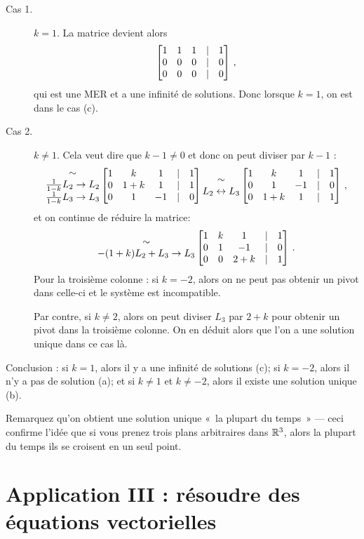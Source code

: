 \begin{myprob}
\begin{mysol}
\begin{description}
	\item[Cas 1.]  $k = 1$.  La matrice devient alors
$$
\left[ \begin{matrix} 
1&1&1&|&1\\
0 & 0 & 0 &|& 0\\
0&0&0&|&0 \end{matrix} \right]\,,
$$
qui est une MER et a une infinité de solutions.  Donc lorsque $k=1$, on est dans le cas (c).
	\item[Cas 2.] $k \neq 1$.  Cela veut dire que $k-1 \neq 0$ et donc on peut diviser par $k-1$ :
$$
\begin{matrix} \sim\\\frac{1}{1-k} L_2\to L_2 \\ \frac{1}{1-k}L_3\to L_3 \end{matrix}
\left[ \begin{matrix} 
1&k&1&|&1\\
0 & 1+k & 1 &|& 1\\
0&1&-1&|&0 \end{matrix} \right]
\begin{matrix} \sim\\L_2 \leftrightarrow L_3 \end{matrix}
\left[ \begin{matrix} 
1&k&1&|&1\\
0&1&-1&|&0\\
0 & 1+k & 1 &|& 1 \end{matrix} \right]\,,
$$
et on continue de réduire la matrice: 
$$
\begin{matrix} \sim \\ -(1+k)L_2+L_3\to L_3 \end{matrix}
\left[ \begin{matrix} 
1&k&1&|&1\\
0&1&-1&|&0\\
0 & 0 & 2+k &|& 1 \end{matrix} \right]\,.
$$
Pour la troisième colonne : si $k = -2$, alors on ne peut pas obtenir un pivot dans celle-ci et le système est incompatible.  

Par contre, si $k\neq 2$, alors on peut diviser $L_3$ par $2+k$ pour obtenir un pivot dans la troisième colonne.
On en déduit alors que l'on a une solution unique dans ce cas là.
\end{description}
Conclusion : si $k=1$, alors il y a une infinité de solutions (c);  si $k=-2$, alors il n'y a pas de solution (a);
et si $k \neq 1$ et $k \neq -2$, alors il existe une solution unique (b).
\end{mysol}\end{myprob}

Remarquez qu'on obtient une solution unique «~la plupart du temps~» --- ceci
confirme l'idée que si vous prenez trois plans arbitraires dans
$\mathbb{R}^3$, alors la plupart du temps ils se croisent en un seul point.

\section{Application III : résoudre des équations vectorielles}

